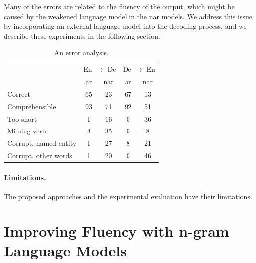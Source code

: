 Many of the errors are related to the fluency of the output, which might be
caused by the weakened language model in the \ac{nar} models. We address this
issue by incorporating an external language model into the decoding process,
and we describe these experiments in the following section.

\begin{table}
  \centering
  \begin{tabular}{lcccc}
    \toprule
    & \multicolumn{2}{c}{En $\rightarrow$ De} & \multicolumn{2}{c}{De $\rightarrow$ En} \\
    & \acs{ar} & \acs{nar} & \acs{ar} & \acs{nar} \\
    \midrule
    Correct        & 65 & 23 & 67 & 13 \\
    Comprehensible & 93 & 71 & 92 & 51 \\
    \midrule
    Too short      & 1 & 16 & 0 & 36 \\
    Missing verb   & 4 & 35 & 0 & 8 \\
    Corrupt. named entity   & 1 & 27 & 8 & 21 \\
    Corrupt. other words & 1 & 20 & 0 & 46 \\
    \bottomrule
  \end{tabular}

  \caption{An error analysis. }%
  \label{tab:end-to-end:error-analysis}

\end{table}


\paragraph{Limitations.} The proposed approaches and the experimental
evaluation have their limitations. 

\section{Improving Fluency with n-gram Language Models}%
\label{sec:ctc:fluency}


